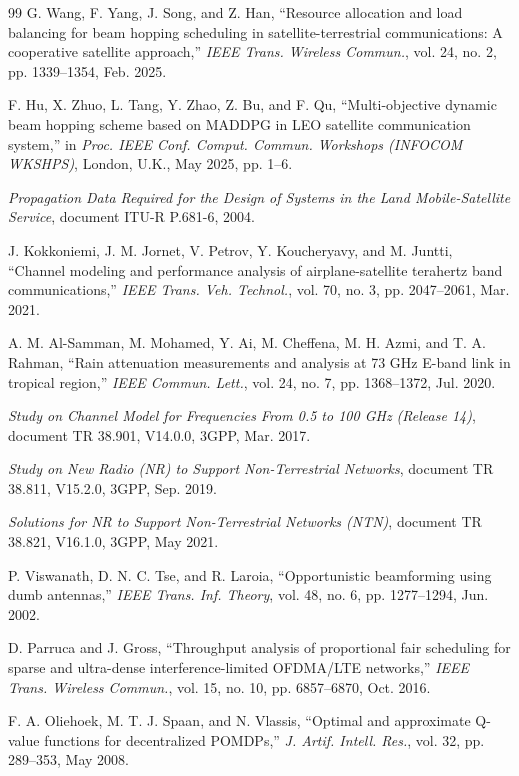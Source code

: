 \documentclass[journal]{IEEEtran}
\newcommand{\revbegin}[1]{\color{revisionblue}\ignorespaces}
\newcommand{\revend}[1]{\color{black}\ignorespaces}
\begin{document}
\begin{thebibliography}{99}
 G. Wang, F. Yang, J. Song, and Z. Han, ``Resource allocation and load balancing for beam hopping scheduling in satellite-terrestrial communications: A cooperative satellite approach,'' \textit{IEEE Trans. Wireless Commun.}, vol. 24, no. 2, pp. 1339--1354, Feb. 2025.

 F. Hu, X. Zhuo, L. Tang, Y. Zhao, Z. Bu, and F. Qu, ``Multi-objective dynamic beam hopping scheme based on MADDPG in LEO satellite communication system,'' in \textit{Proc. IEEE Conf. Comput. Commun. Workshops (INFOCOM WKSHPS)}, London, U.K., May 2025, pp. 1--6.

 \textit{Propagation Data Required for the Design of Systems in the Land Mobile-Satellite Service}, document ITU-R P.681-6, 2004.

 J. Kokkoniemi, J. M. Jornet, V. Petrov, Y. Koucheryavy, and M. Juntti, ``Channel modeling and performance analysis of airplane-satellite terahertz band communications,'' \textit{IEEE Trans. Veh. Technol.}, vol. 70, no. 3, pp. 2047--2061, Mar. 2021.

 A. M. Al-Samman, M. Mohamed, Y. Ai, M. Cheffena, M. H. Azmi, and T. A. Rahman, ``Rain attenuation measurements and analysis at 73 GHz E-band link in tropical region,'' \textit{IEEE Commun. Lett.}, vol. 24, no. 7, pp. 1368--1372, Jul. 2020.

 \textit{Study on Channel Model for Frequencies From 0.5 to 100 GHz (Release 14)}, document TR 38.901, V14.0.0, 3GPP, Mar. 2017.

 \textit{Study on New Radio (NR) to Support Non-Terrestrial Networks}, document TR 38.811, V15.2.0, 3GPP, Sep. 2019.

 \textit{Solutions for NR to Support Non-Terrestrial Networks (NTN)}, document TR 38.821, V16.1.0, 3GPP, May 2021.

\revbegin{} P. Viswanath, D. N. C. Tse, and R. Laroia, ``Opportunistic beamforming using dumb antennas,'' \textit{IEEE Trans. Inf. Theory}, vol. 48, no. 6, pp. 1277--1294, Jun. 2002.\revend{}

\revbegin{} D. Parruca and J. Gross, ``Throughput analysis of proportional fair scheduling for sparse and ultra-dense interference-limited OFDMA/LTE networks,'' \textit{IEEE Trans. Wireless Commun.}, vol. 15, no. 10, pp. 6857--6870, Oct. 2016.\revend{}

 F. A. Oliehoek, M. T. J. Spaan, and N. Vlassis, ``Optimal and approximate Q-value functions for decentralized POMDPs,'' \textit{J. Artif. Intell. Res.}, vol. 32, pp. 289--353, May 2008.


\end{thebibliography}
\end{document}
